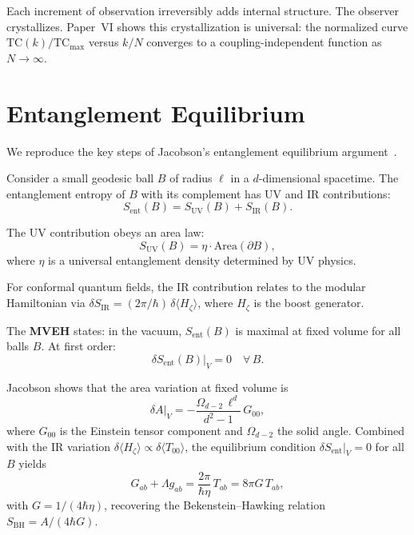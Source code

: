 \documentclass[aps,pra,twocolumn,superscriptaddress,floatfix]{revtex4-2}
\begin{document}
Each increment of observation irreversibly adds internal structure.
The observer crystallizes.
Paper~VI shows this crystallization is universal: the normalized curve $\mathrm{TC}(k)/\mathrm{TC}_{\max}$ versus $k/N$ converges to a coupling-independent function as $N \to \infty$.


\section{Entanglement Equilibrium}
\label{sec:jacobson}

We reproduce the key steps of Jacobson's entanglement equilibrium argument~\cite{jacobson2015}.

Consider a small geodesic ball $B$ of radius $\ell$ in a $d$-dimensional spacetime.
The entanglement entropy of $B$ with its complement has UV and IR contributions:
\begin{equation}
S_{\mathrm{ent}}(B) = S_{\mathrm{UV}}(B) + S_{\mathrm{IR}}(B).
\label{eq:uv_ir}
\end{equation}

The UV contribution obeys an area law:
\begin{equation}
S_{\mathrm{UV}}(B) = \eta \cdot \mathrm{Area}(\partial B),
\label{eq:area_law}
\end{equation}
where $\eta$ is a universal entanglement density determined by UV physics.

For conformal quantum fields, the IR contribution relates to the modular Hamiltonian via $\delta S_{\mathrm{IR}} = (2\pi/\hbar) \, \delta\langle H_\zeta \rangle$, where $H_\zeta$ is the boost generator.

The \textbf{MVEH} states: in the vacuum, $S_{\mathrm{ent}}(B)$ is maximal at fixed volume for all balls $B$.
At first order:
\begin{equation}
\delta S_{\mathrm{ent}}(B)\big|_V = 0 \quad \forall \, B.
\label{eq:mveh}
\end{equation}

Jacobson shows that the area variation at fixed volume is
\begin{equation}
\delta A\big|_V = -\frac{\Omega_{d-2} \, \ell^d}{d^2 - 1} \, G_{00},
\end{equation}
where $G_{00}$ is the Einstein tensor component and $\Omega_{d-2}$ the solid angle.
Combined with the IR variation $\delta\langle H_\zeta \rangle \propto \delta\langle T_{00}\rangle$, the equilibrium condition $\delta S_{\mathrm{ent}}|_V = 0$ for all $B$ yields
\begin{equation}
G_{ab} + \Lambda g_{ab} = \frac{2\pi}{\hbar \eta} \, T_{ab} = 8\pi G \, T_{ab},
\label{eq:einstein}
\end{equation}
with $G = 1/(4\hbar\eta)$, recovering the Bekenstein--Hawking relation $S_{\mathrm{BH}} = A/(4\hbar G)$.
\end{document}

